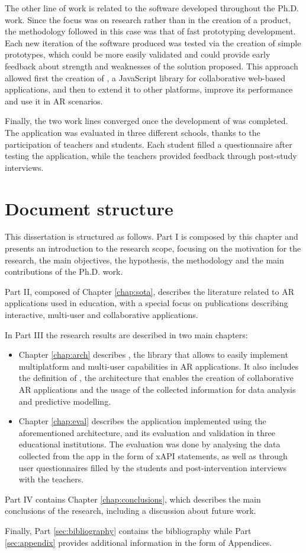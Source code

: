 The other line of work is related to the software developed throughout the Ph.D. work. Since the focus was on research rather than in the creation of a product, the methodology followed in this case was that of fast prototyping development. Each new iteration of the software produced was tested via the creation of simple prototypes, which could be more easily validated and could provide early feedback about strength and weaknesses of the solution proposed. This approach allowed first the creation of \textit{\ork{}}, a JavaScript library for collaborative web-based applications, and then to extend it to other platforms, improve its performance and use it in AR scenarios.

Finally, the two work lines converged once the development of \appname{} was completed. The application was evaluated in three different schools, thanks to the participation of teachers and students. Each student filled a questionnaire after testing the application, while the teachers provided feedback through post-study interviews.

\section{Document structure}
This dissertation is structured as follows. Part I is composed by this chapter and presents an introduction to the research scope, focusing on the motivation for the research, the main objectives, the hypothesis, the methodology and the main contributions of the Ph.D. work.

Part II, composed of Chapter \ref{chap:sota}, describes the literature related to AR applications used in education, with a special focus on publications describing interactive, multi-user and collaborative applications.

In Part III the research results are described in two main chapters:
\begin{itemize}
    \item Chapter \ref{chap:arch} describes \ork{}, the library that allows to easily implement multiplatform and multi-user capabilities in AR applications. It also includes the  definition of \arch{}, the architecture that enables the creation of collaborative AR applications and the usage of the collected information for data analysis and predictive modelling.
    \item Chapter \ref{chap:eval} describes the application implemented using the aforementioned architecture, and its evaluation and validation in three educational institutions. The evaluation was done by analysing the data collected from the app in the form of xAPI statements, as well as through user questionnaires filled by the students and post-intervention interviews with the teachers.
\end{itemize}

Part IV contains Chapter \ref{chap:conclusions}, which describes the main conclusions of the research, including a discussion about future work.

Finally, Part \ref{sec:bibliography} contains the bibliography while Part \ref{sec:appendix} provides additional information in the form of Appendices.